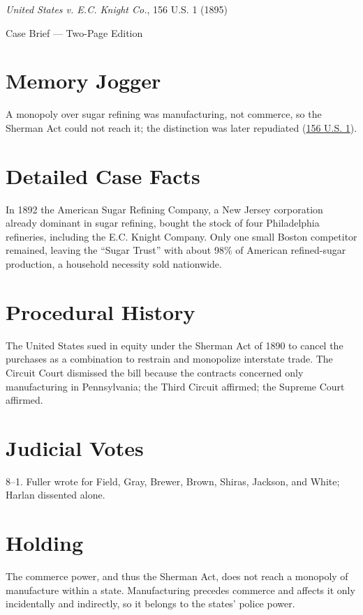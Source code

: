 \documentclass[12pt]{article}
\begin{document}
\begin{center}
{\LARGE \textit{United States v. E.C. Knight Co.}, 156 U.S. 1 (1895)\par}
\vspace{0.5em}
{\large Case Brief --- Two-Page Edition\par}
\end{center}

\section{Memory Jogger}
A monopoly over sugar refining was manufacturing, not commerce, so the Sherman Act could not reach it; the distinction was later repudiated (\href{https://supreme.justia.com/cases/federal/us/156/1/}{156 U.S. 1}).

\section{Detailed Case Facts}
In 1892 the American Sugar Refining Company, a New Jersey corporation already dominant in sugar refining, bought the stock of four Philadelphia refineries, including the E.C. Knight Company. Only one small Boston competitor remained, leaving the ``Sugar Trust'' with about 98\% of American refined-sugar production, a household necessity sold nationwide.

\section{Procedural History}
The United States sued in equity under the Sherman Act of 1890 to cancel the purchases as a combination to restrain and monopolize interstate trade. The Circuit Court dismissed the bill because the contracts concerned only manufacturing in Pennsylvania; the Third Circuit affirmed; the Supreme Court affirmed.

\section{Judicial Votes}
8--1. Fuller wrote for Field, Gray, Brewer, Brown, Shiras, Jackson, and White; Harlan dissented alone.

\section{Holding}
The commerce power, and thus the Sherman Act, does not reach a monopoly of manufacture within a state. Manufacturing precedes commerce and affects it only incidentally and indirectly, so it belongs to the states' police power.
\end{document}
